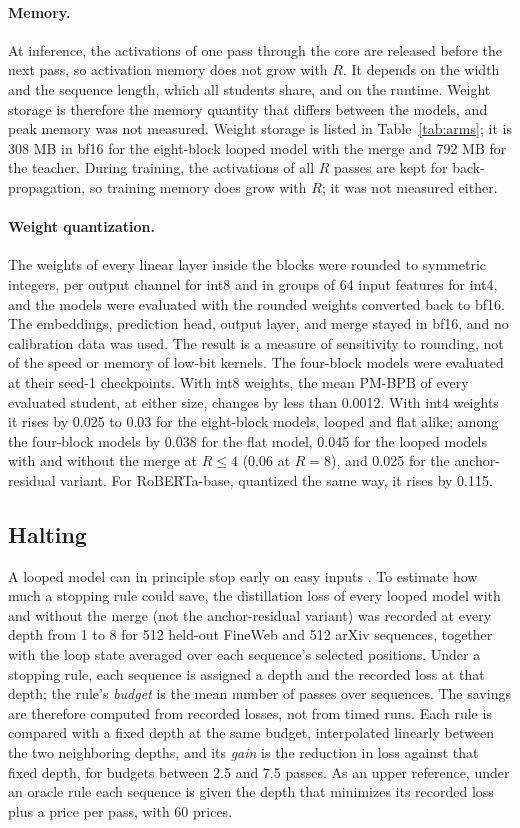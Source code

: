 \documentclass[11pt]{article}
\begin{document}
\paragraph{Memory.}
At inference, the activations of one pass through the core are released before the next pass, so activation memory does not grow with $R$. It
depends on the width and the sequence length, which all students share, and on the runtime. Weight storage is therefore the memory quantity that
differs between the models, and peak memory was not measured. Weight storage is listed in Table~\ref{tab:arms}; it is 308 MB in bf16 for
the eight-block looped model with the merge and 792 MB for the teacher. During training, the activations of all $R$ passes are kept for back-propagation, so training memory does grow with $R$; it was not measured either.

\paragraph{Weight quantization.}
The weights of every linear layer inside the blocks were rounded to symmetric integers, per output channel for int8 and in groups of 64 input
features for int4, and the models were evaluated with the rounded weights converted back to bf16. The embeddings, prediction head, output layer,
and merge stayed in bf16, and no calibration data was used. The result is a measure of sensitivity to rounding, not of the speed or memory of low-bit kernels. The
four-block models were evaluated at their seed-1 checkpoints. With int8 weights, the mean PM-BPB of every evaluated student, at either size,
changes by less than 0.0012. With int4 weights
it rises by 0.025 to 0.03 for the eight-block models, looped and flat alike; among the four-block models by 0.038 for the flat model, 0.045 for
the looped models with and without the merge at $R \le 4$ (0.06 at $R = 8$), and 0.025 for the anchor-residual variant. For RoBERTa-base, quantized
the same way, it rises by 0.115.

\subsection{Halting}
\label{sec:halting}

A looped model can in principle stop early on easy inputs \citep{graves2016act}. To estimate how much a stopping rule could save, the distillation
loss of every looped model with and without the merge (not the anchor-residual variant) was recorded at every depth from 1 to 8 for 512 held-out FineWeb and 512 arXiv sequences, together with the loop state
averaged over each sequence's selected positions. Under a stopping rule, each sequence is assigned a depth and the recorded loss at that depth;
the rule's \emph{budget} is the mean number of passes over sequences. The savings are therefore computed from recorded losses, not from timed runs. Each
rule is compared with a fixed depth at the same budget, interpolated linearly between the two neighboring depths, and its \emph{gain} is the
reduction in loss against that fixed depth, for budgets between 2.5 and 7.5 passes. As an upper reference, under an oracle rule each sequence is given the depth that minimizes its
recorded loss plus a price per pass, with 60 prices.
\end{document}
